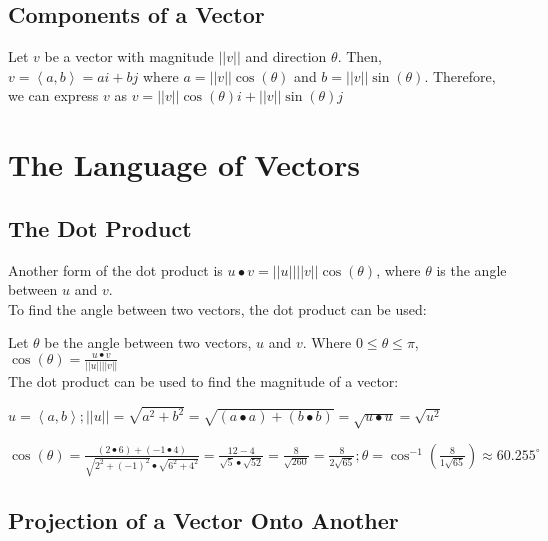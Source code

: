 \documentclass{report}
\begin{document}
\section{Components of a Vector}

Let $v$ be a vector with magnitude $||v||$ and direction $\theta$. Then, $v=\left\langle a,b \right\rangle=ai+bj$ where $a=||v||\cos(\theta)$ and $b=||v||\sin(\theta)$. Therefore, we can express $v$ as $v=||v||\cos(\theta)i+||v||\sin(\theta)j$

\chapter{The Language of Vectors}

\section{The Dot Product}


Another form of the dot product is $u \bullet v=||u||||v||\cos(\theta)$, where $\theta$ is the angle between $u$ and $v$.\\

To find the angle between two vectors, the dot product can be used:

Let $\theta$ be the angle between two vectors, $u$ and $v$. Where $0\le\theta\le\pi$, $\cos(\theta)=\frac{u \bullet v}{||u||||v||}$\\

The dot product can be used to find the magnitude of a vector:

$u=\left\langle a,b \right\rangle;||u||=\sqrt{a^2+b^2}=\sqrt{(a \bullet a)+(b \bullet b)}=\sqrt{u \bullet u}=\sqrt{u^2}$



\sol $\cos(\theta)=\frac{(2 \bullet 6)+(-1 \bullet 4)}{\sqrt{2^2+(-1)^2}\bullet\sqrt{6^2+4^2}}=\frac{12-4}{\sqrt{5}\bullet\sqrt{52}}=\frac{8}{\sqrt{260}}=\frac{8}{2\sqrt{65}};\theta=\cos^{-1}(\frac{8}{1\sqrt{65}})\approx \boxed{60.255^\circ}$

\section{Projection of a Vector Onto Another}
\end{document}
